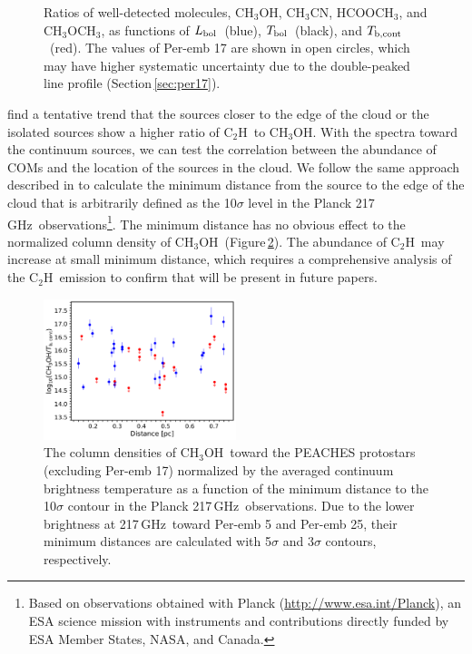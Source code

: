 \documentclass[twocolumn]{aastex62}
\newcommand{\ghz}{\mbox{\,GHz}}
\newcommand{\lbol}{\mbox{$L_{\rm bol}$}}
\newcommand{\tbol}{\mbox{$T_{\rm bol}$}}
\newcommand{\tbc}{\mbox{$T_{\rm b, cont}$}}
\newcommand{\methylformate}{\mbox{HCOOCH$_{3}$}}
\newcommand{\methanol}{\mbox{CH$_{3}$OH}}
\newcommand{\dimethylether}{\mbox{CH$_{3}$OCH$_{3}$}}
\newcommand{\methylcyanide}{\mbox{CH$_{3}$CN}}
\newcommand{\cch}{\mbox{C$_2$H}}
\begin{document}
\begin{figure}[htbp!]
  \caption{Ratios of well-detected molecules, \methanol, \methylcyanide, \methylformate, and \dimethylether, as functions of \lbol\ (blue), \tbol\ (black), and \tbc\ (red).  The values of Per-emb 17 are shown in open circles, which may have higher systematic uncertainty due to the double-peaked line profile (Section\,\ref{sec:per17}).}
  \label{fig:ratios_indicators}
\end{figure}

\citet{2018ApJS..236...52H} find a tentative trend that the sources closer to the edge of the cloud or the isolated sources show a higher ratio of \cch\ to \methanol.  With the spectra toward the continuum sources, we can test the correlation between the abundance of COMs and the location of the sources in the cloud.  We follow the same approach described in \citet{2018ApJS..236...52H} to calculate the minimum distance from the source to the edge of the cloud that is arbitrarily defined as the 10$\sigma$ level in the Planck 217\ghz\ observations\footnote{Based on observations obtained with Planck (\href{http://www.esa.int/Planck}{http://www.esa.int/Planck}), an ESA science mission with instruments and contributions directly funded by ESA Member States, NASA, and Canada.}.  The minimum distance has no obvious effect to the normalized column density of \methanol\ (Figure\,\ref{fig:Dmin}).  The abundance of \cch\ may increase at small minimum distance, which requires a comprehensive analysis of the \cch\ emission to confirm that will be present in future papers.

\begin{figure}[htbp!]
  \centering
  \includegraphics[width=0.5\textwidth]{ch3oh_Dmin.pdf}
  \caption{The column densities of \methanol\ toward the PEACHES protostars (excluding Per-emb 17) normalized by the averaged continuum brightness temperature as a function of the minimum distance to the 10$\sigma$ contour in the Planck 217\ghz\ observations.  Due to the lower brightness at 217\ghz\ toward Per-emb 5 and Per-emb 25, their minimum distances are calculated with 5$\sigma$ and 3$\sigma$ contours, respectively.}
  \label{fig:Dmin}
\end{figure}
\end{document}
